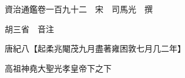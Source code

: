 










 


 
 


 

  
  
  
  
  





  
  
  
  
  
 
  

  

  
  
  



  

 
 

  
   




  

  
  


  　　資治通鑑卷一百九十二　宋　司馬光　撰

　　胡三省　音注

　　唐紀八【起柔兆閹茂九月盡著雍困敦七月几二年】

　　高祖神堯大聖光孝皇帝下之下

